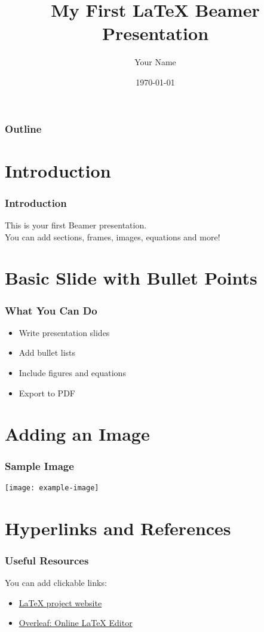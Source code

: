 \documentclass{beamer}
\title{My First LaTeX Beamer Presentation}
\author{Your Name}
\institute{Your Institution}
\date{\today}
\begin{document}
\begin{frame}
  \titlepage
\end{frame}

\begin{frame}
  \frametitle{Outline}
  \tableofcontents
\end{frame}

\section{Introduction}
\begin{frame}
  \frametitle{Introduction}
  This is your first Beamer presentation. \\
  You can add sections, frames, images, equations and more!
\end{frame}

\section{Basic Slide with Bullet Points}
\begin{frame}
  \frametitle{What You Can Do}
  \begin{itemize}
    \item Write presentation slides
    \item Add bullet lists
    \item Include figures and equations
    \item Export to PDF
  \end{itemize}
\end{frame}

\section{Adding an Image}
\begin{frame}
  \frametitle{Sample Image}
  \begin{center}
    \texttt{[image: example-image]} %
  \end{center}
\end{frame}

\section{Hyperlinks and References}
\begin{frame}
  \frametitle{Useful Resources}
  You can add clickable links:

  \begin{itemize}
    \item \href{https://www.latex-project.org/}{LaTeX project website}
    \item \href{https://overleaf.com}{Overleaf: Online LaTeX Editor}
  \end{itemize}
\end{frame}
\end{document}
